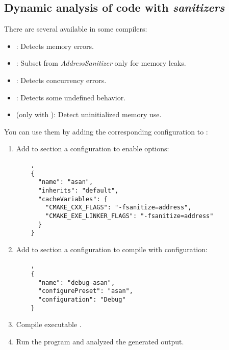 \subsection{Dynamic analysis of code with \emph{sanitizers}}

There are several  
available in some compilers:

\begin{itemize}
  \item {}: 
        Detects memory errors.
  \item {}: 
        Subset from \emph{AddressSanitizer} 
        only for memory leaks.
  \item {}: 
        Detects concurrency errors.
  \item {}: 
        Detects some undefined behavior.
  \item {} (only with ): 
        Detect uninitialized memory use.
\end{itemize}

You can use them by adding the corresponding configuration to
:

\begin{enumerate}

\item 
Add to section  
a configuration to enable 
options:

\begin{lstlisting}
    ,
    {
      "name": "asan",
      "inherits": "default",
      "cacheVariables": {
        "CMAKE_CXX_FLAGS": "-fsanitize=address",
        "CMAKE_EXE_LINKER_FLAGS": "-fsanitize=address"
      }
    }
\end{lstlisting}

\item 
Add to section 
a configuration to compile with 
configuration:

\begin{lstlisting}
    ,
    {
      "name": "debug-asan",
      "configurePreset": "asan",
      "configuration": "Debug"
    }
\end{lstlisting}

\item
Compile executable 
.

\item
Run the program and analyzed the generated output.

\end{enumerate}
